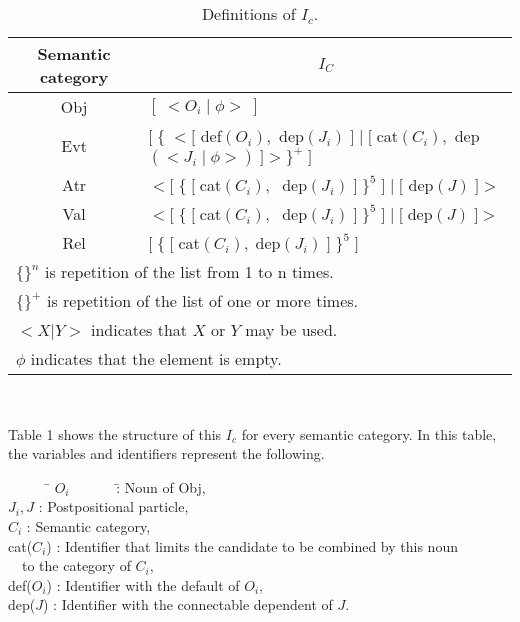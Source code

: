 \begin{table}
\begin{center}
\caption{Definitions of  $I_c$.}

\begin{tabular}{c|l} \hline
Semantic category & \multicolumn{1}{|c}{$I_C$}\\ \hline
Obj &	$[ \; < O_i \; |\; \phi > \; ]$ \\[1.5ex] 
Evt &   $[\; \{\; < [ $ def$(O_i),$ dep$(J_i)\; ]\; |\; [ \; $cat$(C_i) ,$
 dep$( < J_i \; | \; \phi> )\; ] > \} ^+ \; ]$ \\[1.5ex]
Atr &   $<  [ \; \{ \; [ \; $cat$(C_i) ,\; $
dep$(J_i)\; ] \; \} ^5 \; ] \; | \; [$ dep$(J) \; ] >$ \\[1.5ex]
Val &  $<  [ \; \{ \; [\; $cat$(C_i) ,\; $
dep$(J_i)\; ] \; \} ^5\; ]\; |\; [ \;$dep$(J)\; ] >$ \\[1.5ex] 
Rel &  $[\; \{ \; [\; $cat$(C_i) ,\; $dep$(J_i) \; ] \; \} ^5\; ]$ \\[1.5ex] 
\hline
\multicolumn{2}{l}{\footnotesize
$\{ \}^n$ is repetition of the list from 1 to n times.}\\
\multicolumn{2}{l}{\footnotesize
$\{ \}^+$ is repetition of the list of one or more times.}\\
\multicolumn{2}{l}{\footnotesize
$< X | Y>$ indicates that $X$ or $Y$ may be used.}\\
\multicolumn{2}{l}{\footnotesize
$\phi$ indicates that the element is empty.}\\
\end{tabular}\\
\end{center}
\end{table}

Table 1 shows the structure of this $I_c$ for every semantic category.
In this table, the variables and identifiers represent the following.
\begin{tabbing}
\ \ \ \ \ \ \= $O_i$ \ \ \ \ \ \ \= : Noun of Obj,\\
          \> $J_i,J$ \> : Postpositional particle,\\
          \> $C_i$ \>: Semantic category,\\
         \> cat($C_i$) \>: Identifier that limits the candidate to be
 combined by this noun \\
         \> \> \ \ to the category of $C_i$,\\
         \> def($O_i$) \>: Identifier with the default of $O_i$,\\
         \> dep($J$) \> : Identifier with the connectable dependent
 of $J$.
\end{tabbing}

